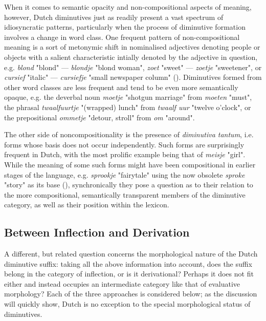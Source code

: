 When it comes to semantic opacity and non-compositional aspects of meaning, however, Dutch diminutives just as readily present a vast spectrum of idiosyncratic patterns, particularly when the process of diminutive formation involves a change in word class. One frequent pattern of non-compositional meaning is a sort of metonymic shift in nominalised adjectives denoting people or objects with a salient characteristic intially denoted by the adjective in question, e.g. \textit{blond} "blond" --- \textit{blondje} "blond woman", \textit{zoet} "sweet" --- \textit{zoetje} "sweetener", or \textit{cursief} "italic" --- \textit{cursiefje} "small newspaper column" (\cite{taalportaal}). Diminutives formed from other word classes are less frequent and tend to be even more semantically opaque, e.g. the deverbal noun \textit{moetje} "shotgun marriage" from \textit{moeten} "must", the phrasal \textit{twaalfuurtje} "(wrapped) lunch" from \textit{twaalf uur} "twelve o'clock", or the prepositional \textit{ommetje} "detour, stroll" from \textit{om} "around". 

The other side of noncompositionality is the presence of \textit{diminutiva tantum}, i.e. forms whose basis does not occur independently. Such forms are surprisingly frequent in Dutch, with the most prolific example being that of \textit{meisje} "girl". While the meaning of some such forms might have been compositional in earlier stages of the language, e.g. \textit{sprookje} "fairytale" using the now obsolete \textit{sproke} "story" as its base (\cite{taalportaal}), synchronically they pose a question as to their relation to the more compositional, semantically transparent members of the diminutive category, as well as their position within the lexicon.

\subsection{Between Inflection and Derivation}
A different, but related question concerns the morphological nature of the Dutch diminutive suffix: taking all the above information into account, does the suffix belong in the category of inflection, or is it derivational? Perhaps it does not fit either and instead occupies an intermediate category like that of evaluative morphology? Each of the three approaches is considered below; as the discussion will quickly show, Dutch is no exception to the special morphological status of diminutives.

